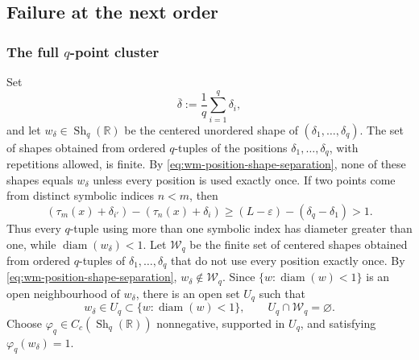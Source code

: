 \documentclass[11pt,reqno,a4paper]{amsart}
\numberwithin{equation}{section}
\theoremstyle{compact}
\theoremstyle{definition}
\theoremstyle{definition}
\newcommand{\Sh}{\operatorname{Sh}}
\begin{document}
\subsection{Failure at the next order}
\label{subsec:wm-failure}

\subsubsection{The full $q$-point cluster}
Set
\begin{equation}\label{eq:wm-offset-barycenter}
  \overline\delta:=\frac1q\sum_{i=1}^q\delta_i,
\end{equation}
and let $w_\delta\in\Sh_q(\mathbb R)$ be the centered unordered shape of
$(\delta_1,\ldots,\delta_q)$.  The set of shapes obtained from ordered
$q$-tuples of the positions $\delta_1,\ldots,\delta_q$, with repetitions
allowed, is finite.  By \eqref{eq:wm-position-shape-separation}, none of
these shapes equals $w_\delta$ unless every position is used exactly once.
If two points come from distinct symbolic indices $n<m$, then
\[
  (\tau_m(x)+\delta_{i'})-(\tau_n(x)+\delta_i)
  \geq (L-\varepsilon)-(\delta_q-\delta_1)>1.
\]
Thus every $q$-tuple using more than one symbolic index has diameter greater
than one, while $\operatorname{diam}(w_\delta)<1$.  Let $\mathcal W_q$ be
the finite set of centered shapes obtained from ordered $q$-tuples of
$\delta_1,\ldots,\delta_q$ that do not use every position exactly once.
By \eqref{eq:wm-position-shape-separation}, $w_\delta\notin\mathcal W_q$.
Since $\{w:\operatorname{diam}(w)<1\}$ is an open neighbourhood of
$w_\delta$, there is an open set $U_q$ such that
\[
  w_\delta\in U_q\subset\{w:\operatorname{diam}(w)<1\},
  \qquad
  U_q\cap\mathcal W_q=\varnothing.
\]
Choose $\varphi_q\in C_c(\Sh_q(\mathbb R))$ nonnegative, supported in
$U_q$, and satisfying $\varphi_q(w_\delta)=1$.
\end{document}
